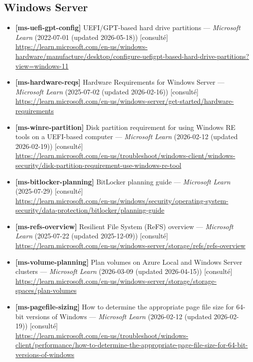 \documentclass[10pt,a4paper]{article}
\begin{document}
\subsection{Windows Server}
\begin{itemize}[leftmargin=1.6em]
\item \textbf{[ms-uefi-gpt-config]} UEFI/GPT-based hard drive partitions --- \textit{Microsoft Learn} (2022-07-01 (updated 2026-05-18)) \textcolor{cOk}{[consult\'e]}\\ \url{https://learn.microsoft.com/en-us/windows-hardware/manufacture/desktop/configure-uefigpt-based-hard-drive-partitions?view=windows-11}
\item \textbf{[ms-hardware-reqs]} Hardware Requirements for Windows Server --- \textit{Microsoft Learn} (2025-07-02 (updated 2026-02-16)) \textcolor{cOk}{[consult\'e]}\\ \url{https://learn.microsoft.com/en-us/windows-server/get-started/hardware-requirements}
\item \textbf{[ms-winre-partition]} Disk partition requirement for using Windows RE tools on a UEFI-based computer --- \textit{Microsoft Learn} (2026-02-12 (updated 2026-02-19)) \textcolor{cOk}{[consult\'e]}\\ \url{https://learn.microsoft.com/en-us/troubleshoot/windows-client/windows-security/disk-partition-requirement-use-windows-re-tool}
\item \textbf{[ms-bitlocker-planning]} BitLocker planning guide --- \textit{Microsoft Learn} (2025-07-29) \textcolor{cOk}{[consult\'e]}\\ \url{https://learn.microsoft.com/en-us/windows/security/operating-system-security/data-protection/bitlocker/planning-guide}
\item \textbf{[ms-refs-overview]} Resilient File System (ReFS) overview --- \textit{Microsoft Learn} (2025-07-22 (updated 2025-12-09)) \textcolor{cOk}{[consult\'e]}\\ \url{https://learn.microsoft.com/en-us/windows-server/storage/refs/refs-overview}
\item \textbf{[ms-volume-planning]} Plan volumes on Azure Local and Windows Server clusters --- \textit{Microsoft Learn} (2026-03-09 (updated 2026-04-15)) \textcolor{cOk}{[consult\'e]}\\ \url{https://learn.microsoft.com/en-us/windows-server/storage/storage-spaces/plan-volumes}
\item \textbf{[ms-pagefile-sizing]} How to determine the appropriate page file size for 64-bit versions of Windows --- \textit{Microsoft Learn} (2026-02-12 (updated 2026-02-19)) \textcolor{cOk}{[consult\'e]}\\ \url{https://learn.microsoft.com/en-us/troubleshoot/windows-client/performance/how-to-determine-the-appropriate-page-file-size-for-64-bit-versions-of-windows}

\end{itemize}
\end{document}
